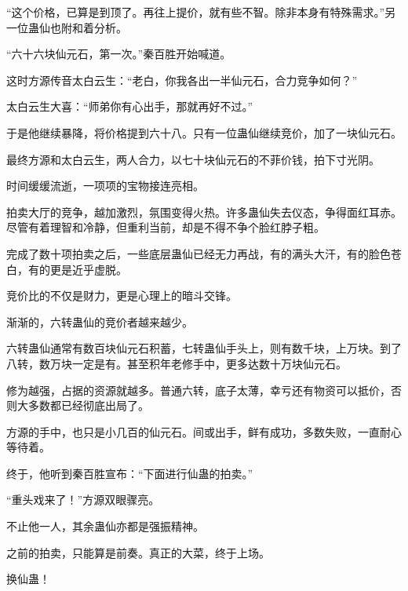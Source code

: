 \begin{this_body}
“这个价格，已算是到顶了。再往上提价，就有些不智。除非本身有特殊需求。”另一位蛊仙也附和着分析。

“六十六块仙元石，第一次。”秦百胜开始喊道。

这时方源传音太白云生：“老白，你我各出一半仙元石，合力竞争如何？”

太白云生大喜：“师弟你有心出手，那就再好不过。”

于是他继续暴降，将价格提到六十八。只有一位蛊仙继续竞价，加了一块仙元石。

最终方源和太白云生，两人合力，以七十块仙元石的不菲价钱，拍下寸光阴。

时间缓缓流逝，一项项的宝物接连亮相。

拍卖大厅的竞争，越加激烈，氛围变得火热。许多蛊仙失去仪态，争得面红耳赤。尽管有着理智和冷静，但重利当前，却是不得不争个脸红脖子粗。

完成了数十项拍卖之后，一些底层蛊仙已经无力再战，有的满头大汗，有的脸色苍白，有的更是近乎虚脱。

竞价比的不仅是财力，更是心理上的暗斗交锋。

渐渐的，六转蛊仙的竞价者越来越少。

六转蛊仙通常有数百块仙元石积蓄，七转蛊仙手头上，则有数千块，上万块。到了八转，数万块一定是有。甚至积年老修手中，更多达数十万块仙元石。

修为越强，占据的资源就越多。普通六转，底子太薄，幸亏还有物资可以抵价，否则大多数都已经彻底出局了。

方源的手中，也只是小几百的仙元石。间或出手，鲜有成功，多数失败，一直耐心等待着。

终于，他听到秦百胜宣布：“下面进行仙蛊的拍卖。”

“重头戏来了！”方源双眼骤亮。

不止他一人，其余蛊仙亦都是强振精神。

之前的拍卖，只能算是前奏。真正的大菜，终于上场。

换仙蛊！

\end{this_body}

